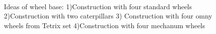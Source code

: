 \begin{enumerate}
\begin{enumerate}
\begin{enumerate}
\begin{enumerate}
	      \begin{figure}[h]
	      	\begin{minipage}[h]{0.165\linewidth}
	      		\center  
	      	\end{minipage}
	      	\begin{minipage}[h]{0.6\linewidth}
	          \caption{Ideas of wheel base: 1)Construction with four standard wheels 2)Construction with two caterpillars 3) Construction with four omny wheels from Tetrix set 4)Construction with four mechanum wheels}
	        \end{minipage}
	      \end{figure}
	      

\end{enumerate}
\end{enumerate}
\end{enumerate}
\end{enumerate}
